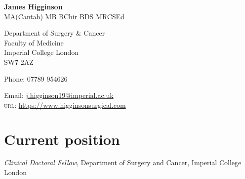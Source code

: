 \documentclass[11pt]{article} %
\begin{document}

{\LARGE\bfseries James Higginson} %
\\{\Large MA(Cantab) MB BChir BDS MRCSEd}
\bigskip\bigskip\medskip %

Department of Surgery \& Cancer\\
Faculty of Medicine\\ %
Imperial College London\\
SW7 2AZ

\medskip %

Phone: 07789 954626\\ %
\medskip %

Email: \href{mailto:j.higginson19@imperial.ac.uk}{j.higginson19@imperial.ac.uk}\\ %
\textsc{url}: \href{https://www.higginsonsurgical.com}{https://www.higginsonsurgical.com}\\ %

\vspace{0.06\textheight} %


\section*{Current position}

\emph{Clinical Doctoral Fellow}, Department of Surgery and Cancer, Imperial College London%





\end{document}
